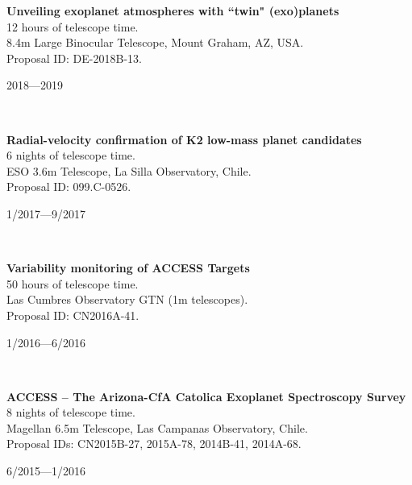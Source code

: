 \documentclass[12pt, a4paper]{article} %
\begin{document}
\begin{minipage}[t]{0.7\textwidth}
\begin{flushleft}%
  \setlength{\leftskip}{0.2cm}%
\textbf{Unveiling exoplanet atmospheres with ``twin" (exo)planets}\\
12 hours of telescope time.\\
8.4m Large Binocular Telescope, Mount Graham, AZ, USA.\\ 
Proposal ID: DE-2018B-13.
\end{flushleft}
\end{minipage}
\begin{minipage}[t]{0.3\textwidth}
\hfill 2018---2019
\end{minipage}\\

\begin{minipage}[t]{0.7\textwidth}
\begin{flushleft}%
  \setlength{\leftskip}{0.2cm}%
\textbf{Radial-velocity confirmation of K2 low-mass planet candidates}\\
6 nights of telescope time.\\
ESO 3.6m Telescope, La Silla Observatory, Chile.\\
Proposal ID: 099.C-0526.
\end{flushleft}
\end{minipage}
\begin{minipage}[t]{0.3\textwidth}
\hfill 1/2017---9/2017
\end{minipage}\\

\begin{minipage}[t]{0.7\textwidth}
\begin{flushleft}%
  \setlength{\leftskip}{0.2cm}%
\textbf{Variability monitoring of ACCESS Targets}\\
50 hours of telescope time.\\
Las Cumbres Observatory GTN (1m telescopes).\\
Proposal ID: CN2016A-41.
\end{flushleft}
\end{minipage}
\begin{minipage}[t]{0.3\textwidth}
\hfill 1/2016---6/2016
\end{minipage}\\

\begin{minipage}[t]{0.7\textwidth}
\begin{flushleft}%
  \setlength{\leftskip}{0.2cm}%
\textbf{ACCESS -- The Arizona-CfA Catolica Exoplanet Spectroscopy Survey}\\
8 nights of telescope time.\\
Magellan 6.5m Telescope, Las Campanas Observatory, Chile.\\
Proposal IDs: CN2015B-27, 2015A-78, 2014B-41, 2014A-68.
\end{flushleft}
\end{minipage}
\begin{minipage}[t]{0.3\textwidth}
\hfill 6/2015---1/2016
\end{minipage}
\end{document}
